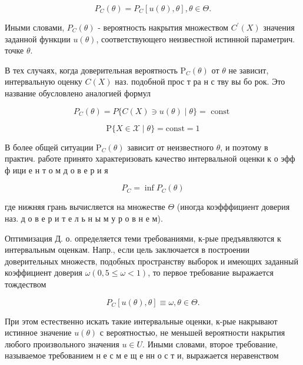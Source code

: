 \documentclass[10pt]{article}
\begin{document}
\[

P_{C}(\theta)=P_{C}[u(\theta), \theta], \theta \in \Theta .

\]



Иными словами, $P_{C}(\theta)$ - вероятность накрытия множеством $C^{\prime}(X)$ значения заданной функции $u(\theta)$, соответствующего неизвестной истинной параметрич. точке $\theta$.



В тех случаях, когда доверительная вероятность $\mathrm{P}_{C}(\theta)$ от $\theta$ не зависит, интервальную оценку $C(X)$ наз. подобной прос т ра н с тву вы бо рок. Это название обусловлено аналогией формул



\[

P_{C}(\theta)=P\{C(X) \ni u(\theta) \mid \theta\}=\text { const }

\]



\[

\mathrm{P}\{X \in \mathscr{X} \mid \theta\}=\mathrm{const}=1

\]



В более общей ситуации $\mathrm{P}_{C}(\theta)$ зависит от неизвестного $\theta$, и поэтому в практич. работе принято характеризовать качество интервальной оценки к о эфф ф ици е н т о м д о в е р и я



\[

P_{C}=\inf P_{C}(\theta)

\]



где нижняя грань вычисляется на множестве $\Theta$ (иногда коэфффициент доверия наз. д о в е р и т е л ь н ы м у р о в н е м).



Оптимизация Д. о. определяется теми требованиями, к-рые предъявляются к интервальным оценкам. Напр., если цель заключается в построении доверительных множеств, подобных пространству выборок и имеющих заданный коэффициент доверия $\omega(0,5 \leqslant \omega<1)$, то первое требование выражается тождеством



\[

P_{C}[u(\theta), \theta] \equiv \omega, \theta \in \Theta .

\]



При этом естественно искать такие интервальные оценки, к-рые накрывают истинное значение $u(\theta)$ с вероятностью, не меньшей вероятности накрытия любого произвольного значения $u \in U$. Иными словами, второе требование, называемое требованием н е с м е щ е нн о с т и, выражается неравенством
\end{document}
